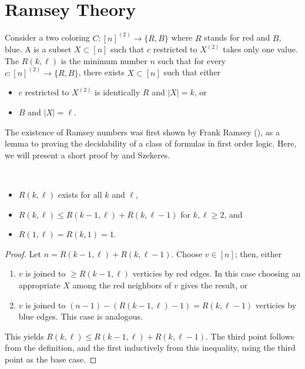 
\section{Ramsey Theory}

Consider a two coloring $C: [n]^{(2)}\to \{R,B\}$ where $R$ stands for red and $B$, blue.
A  is a subset $X\subset [n]$ such that $c$ restricted to $X^{(2)}$ takes only one value.
The  $R(k,\ell)$ is the minimum number $n$ such that for every $c: [n]^{(2)} \to \{R,B\}$, there exists $X\subset[n]$ such that either
\begin{itemize}
	\item $c$ restricted to $X^{(2)}$ is identically $R$ and $|X|=k$, or
	\item {} $B$ and $|X| = \ell$.
\end{itemize}
\begin{remark}
The existence of Ramsey numbers was first shown by Frank Ramsey (\cite{ramsey1930problem}), as a lemma to proving the decidability of a class of formulas in first order logic. Here, we will present a short proof by \erdos  and Szekeres.
\end{remark}
\begin{theorem}
~\begin{itemize}
	\item $R(k,\ell)$ exists for all $k$ and $\ell$,
	\item $R(k,\ell) \leq R(k-1,\ell) + R(k,\ell-1)$ for $k,\ell\geq 2$, and
	\item $R(1,\ell) = R(k,1) = 1$. 
\end{itemize}
\end{theorem}
\begin{proof}	
Let $n = R(k-1,\ell) + R(k,\ell-1)$. Choose $v\in [n]$; then, either
\begin{enumerate}[(1)]
  \item  $v$ is joined to $\geq R(k-1,\ell)$ verticies by red edges. In this case choosing an appropriate $X$ among the red neighbors of $v$ gives the result, or
  \item $v$ is joined to $(n-1) - (R(k-1,\ell)-1) = R(k,\ell-1)$ verticies by blue edges. This case is analogous.
\end{enumerate}
This yields $R(k,\ell) \leq R(k-1,\ell) + R(k,\ell-1)$. The third point follows from the definition, and the first inductively from this inequality, using the third point as the base case.
\end{proof}
